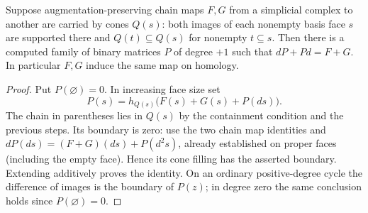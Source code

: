 \begin{lemma}\label{idx-algebraic227}
Suppose augmentation-preserving chain maps $F,G$ from a simplicial
complex to another are carried by cones $Q(s)$: both images of each
nonempty basis face $s$ are supported there and
$Q(t)\subseteq Q(s)$ for nonempty $t\subseteq s$. Then there is a
computed family of binary matrices $P$ of degree $+1$ such that
$dP+Pd=F+G$. In particular $F,G$ induce the same map on homology.
\end{lemma}
\begin{proof}
Put $P(\varnothing)=0$. In increasing face size set
\[
 P(s)=h_{Q(s)}\bigl(F(s)+G(s)+P(d s)\bigr).
\]
The chain in parentheses lies in $Q(s)$ by the containment condition and
the previous steps. Its boundary is zero: use the two chain map
identities and $dP(d s)=(F+G)(d s)+P(d^2s)$, already established on
proper faces (including the empty face). Hence its cone filling has the
asserted boundary. Extending additively proves the identity. On an
ordinary positive-degree cycle the difference of images is the boundary
of $P(z)$; in degree zero the same conclusion holds since
$P(\varnothing)=0$.
\end{proof}

